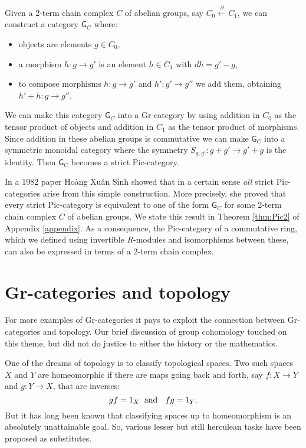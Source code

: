 \documentclass[reqno,12pt]{amsart}
\newcommand{\maps}{\colon}    %
\newcommand{\G}{{\mathsf{G}}}   %
\theoremstyle{definition}
\begin{document}
Given a 2-term chain complex $C$ of abelian groups, say $C_0 \xleftarrow{\;\partial\;} C_1 $, we can construct a category $\G_C$ where:
\begin{itemize}
\item  objects are elements $g \in C_0$,
\item  a morphism $h \maps g \to g'$ is an element $h \in C_1$ with $dh = g' - g$,
\item to compose morphisms $h \maps g \to g'$ and $h' \maps g' \to g''$ we add them,
obtaining $h' + h \maps g \to g''$.
\end{itemize}
We can make this category $\G_C$ into a Gr-category by using addition in $C_0$ as the tensor product of objects and addition in $C_1$ as the tensor product of morphisms.  Since addition in these abelian groups is commutative we can make $\G_C$ into a symmetric monoidal category where the symmetry $S_{g,g'} \colon g + g' \to g' + g$ is the identity.  Then $\G_C$ becomes a strict Pic-category.

In a 1982 paper \cite{H82} Ho\`ang Xu\^an S\'inh showed that in a certain sense \emph{all} strict Pic-categories arise from this simple construction.  More precisely, she proved that every strict Pic-category is equivalent to one of the form $\G_C$ for some 2-term chain complex $C$ of abelian groups.   We state this result in Theorem \ref{thm:Pic2} of Appendix \ref{appendix}.  As a consequence, the Pic-category of a commutative ring, which we defined using invertible $R$-modules and isomorphisms between these, can also be expressed in terms of a 2-term chain complex.

\section{Gr-categories and topology}
\label{sec:topology}

For more examples of Gr-categories it pays to exploit the connection between Gr-categories and topology.  Our brief discussion of group cohomology touched on this theme, but did not do justice to either the history or the mathematics.  

One of the dreams of topology is to classify topological spaces.   Two such spaces $X$ and $Y$ are homeomorphic if there are maps going back and forth, say $f \maps X \to Y$ and $g \maps Y \to X$, that are inverses:
\[        gf = 1_X \textrm{\; and \; }  fg = 1_Y. \]    
But it has long been known that classifying spaces up to homeomorphism is an absolutely unattainable goal.  So, various lesser but still herculean tasks have been proposed as substitutes.  
\end{document}
